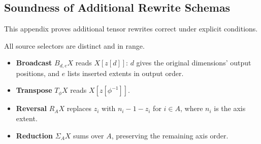 \subsection{Soundness of Additional Rewrite Schemas}
\label{app:axis-extensions}
This appendix proves additional tensor rewrites correct under explicit conditions.

All source selectors are distinct and in range.
\begin{itemize}
\item \textbf{Broadcast} $B_{d,e}X$ reads $X[z[d]]$:
$d$ gives the original dimensions' output positions, and $e$
lists inserted extents in output order.
\item \textbf{Transpose} $T_\phi X$ reads $X[z[\phi^{-1}]]$.
\item \textbf{Reversal} $R_AX$ replaces $z_i$ with $n_i-1-z_i$
for $i\in A$, where $n_i$ is the axis extent.
\item \textbf{Reduction} $\Sigma_AX$ sums over $A$,
preserving the remaining axis order.
\end{itemize}

